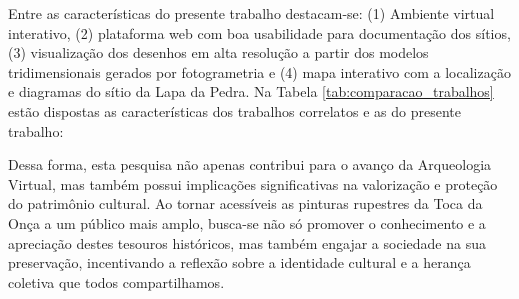 Entre as características do presente trabalho destacam-se: (1) Ambiente virtual interativo, (2) plataforma web com boa usabilidade para documentação dos sítios, (3) visualização dos desenhos em alta resolução a partir dos modelos tridimensionais gerados por fotogrametria e (4) mapa interativo com a localização e diagramas do sítio da Lapa da Pedra. Na Tabela \ref{tab:comparacao_trabalhos} estão dispostas as características dos trabalhos correlatos e as do presente trabalho:
\begin{table}[h!]
\centering
{}
\caption{Comparação entre os trabalhos correlatos e o presente trabalho.}
\label{tab:comparacao_trabalhos}
\end{table}

Dessa forma, esta pesquisa não apenas contribui para o avanço da Arqueologia Virtual, mas também possui implicações significativas na valorização e proteção do patrimônio cultural. Ao tornar acessíveis as pinturas rupestres da Toca da Onça a um público mais amplo, busca-se não só promover o conhecimento e a apreciação destes tesouros históricos, mas também engajar a sociedade na sua preservação, incentivando a reflexão sobre a identidade cultural e a herança coletiva que todos compartilhamos.

